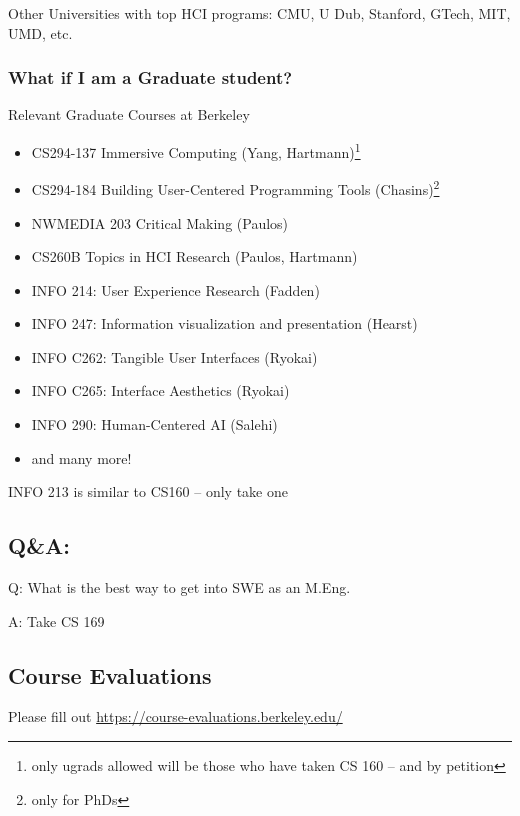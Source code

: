 Other Universities with top HCI programs: CMU, U Dub, Stanford, GTech, MIT,
UMD, etc.

\subsubsection{What if I am a Graduate student?}
Relevant Graduate Courses at Berkeley
\begin{itemize}
    \item CS294-137 Immersive Computing (Yang, Hartmann)\footnote{only ugrads allowed will be those who have taken CS 160 -- and by petition}
    \item CS294-184 Building User-Centered Programming Tools (Chasins)\footnote{only for PhDs}
    \item NWMEDIA 203 Critical Making (Paulos)
    \item CS260B Topics in HCI Research (Paulos, Hartmann)
    \item INFO 214: User Experience Research (Fadden)
    \item INFO 247: Information visualization and presentation (Hearst)
    \item INFO C262: Tangible User Interfaces (Ryokai)
    \item INFO C265: Interface Aesthetics (Ryokai)
    \item INFO 290: Human-Centered AI (Salehi)
    \item and many more!
\end{itemize}
\begin{important}
INFO 213 is similar to CS160 – only take one
\end{important}

\subsection{Q\&A:}
\begin{shaded}
Q: What is the best way to get into SWE as an M.Eng.

A: Take CS 169
\end{shaded}

\subsection{Course Evaluations}
Please fill out \href{https://course-evaluations.berkeley.edu/}{https://course-evaluations.berkeley.edu/}
